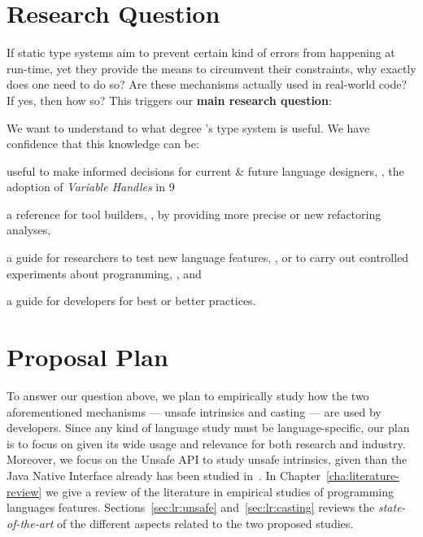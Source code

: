 \section{Research Question}

If static type systems aim to prevent certain kind of errors from happening at run-time,
yet they provide the means to circumvent their constraints,
why exactly does one need to do so?
Are these mechanisms actually used in real-world code?
If yes, then how so?
This triggers our \textbf{main research question}:


We want to understand to what degree \java{}'s type system is useful.
We have confidence that this knowledge can be:
\begin{inparaenum}[a)]
\item useful to make informed decisions for current \& future language designers,
\eg{}, the adoption of \emph{Variable Handles} in \java{} 9~\cite{jep193}
\item a reference for tool builders, \eg{}, by providing more precise or new refactoring analyses,
\item a guide for researchers to test new language features, \eg{}, \cite{wintherGuardedTypePromotion2011} or to carry out controlled experiments about programming, \eg{}, \cite{stuchlikStaticVsDynamic2011} and
\item a guide for developers for best or better practices.
\end{inparaenum}

\section{Proposal Plan}

To answer our question above,
we plan to empirically study how the two aforementioned mechanisms
--- unsafe intrinsics and casting ---
are used by developers.
Since any kind of language study must be language-specific,
our plan is to focus on \java{} given its wide usage and relevance for both research and industry.
Moreover, we focus on the \java{} Unsafe API to study unsafe intrinsics,
given than the Java Native Interface already has been studied in~\cite{tanSafeJavaNative2006,tanEmpiricalSecurityStudy2008,kondohFindingBugsJava2008,sunNativeGuardProtectingAndroid2014,liFindingBugsExceptional2009}.
In Chapter~\ref{cha:literature-review} we give a review of the literature in empirical studies of programming languages features.
Sections~\ref{sec:lr:unsafe} and~\ref{sec:lr:casting} reviews the \emph{state-of-the-art} of the different aspects related to the two proposed studies.

